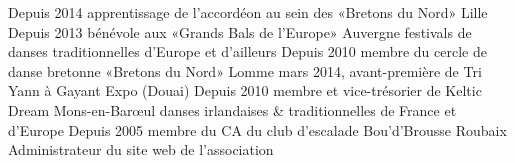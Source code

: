 \documentclass[]{cv} %
\begin{document}
\begin{entrylist}
\entry
{Depuis 2014}
{{\normalfont apprentissage de l'accordéon au sein des «Bretons du Nord»}}
{Lille}
{}
\entry
{Depuis 2013}
{{\normalfont bénévole aux «Grands Bals de l'Europe»}}
{Auvergne}
{festivals de danses traditionnelles d'Europe et d'ailleurs}
\entry
{Depuis 2010}
{{\normalfont membre du cercle de danse bretonne «Bretons du Nord»}}
{Lomme}
{mars 2014, avant-première de Tri Yann à Gayant Expo (Douai)}
\entry
{Depuis 2010}
{{\normalfont membre et vice-trésorier de Keltic Dream}}
{Mons-en-Barœul}
{danses irlandaises \& traditionnelles de France et d'Europe}
\entry
{Depuis 2005}
{{\normalfont membre du CA du club d'escalade Bou'd'Brousse}}
{Roubaix}
{Administrateur du site web de l'association}
\end{entrylist}
\end{document}
